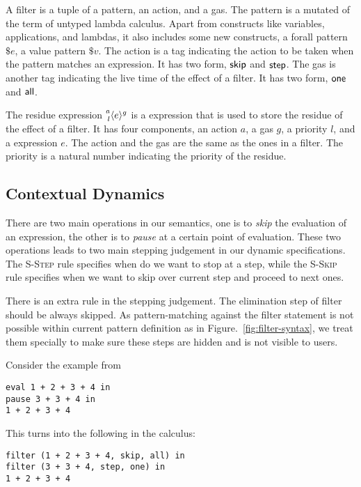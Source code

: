 A filter is a tuple of a pattern, an action, and a gas. The pattern
is a mutated of the term of untyped lambda calculus. Apart from constructs like
variables, applications, and lambdas, it also includes some new constructs, a
forall pattern \(\$e\), a value pattern \(\$v\). The action is a tag indicating
the action to be taken when the pattern matches an expression. It has two
form, \(\ActSkip\) and \(\ActStep\). The gas is another tag indicating the
live time of the effect of a filter. It has two form, \(\GasOne\) and
\(\GasAll\).

The residue expression \(\Residue{a}{g}{l}{e}\) is a expression that is used to
store the residue of the effect of a filter. It has four components, an action
\(a\), a gas \(g\), a priority \(l\), and a expression \(e\). The action and the
gas are the same as the ones in a filter. The priority is a natural number
indicating the priority of the residue.

\subsection{Contextual Dynamics}

There are two main operations in our semantics, one is to \emph{skip} the
evaluation of an expression, the other is to \emph{pause} at a certain point of
evaluation. These two operations leads to two main stepping judgement in our
dynamic specifications. The \textsc{S-Step} rule specifies when do we want to
stop at a step, while the \textsc{S-Skip} rule specifies when we want to skip over
current step and proceed to next ones.

There is an extra rule in the stepping judgement. The elimination step of filter
should be always skipped. As pattern-matching against the filter statement is
not possible within current pattern definition as in
Figure.~\ref{fig:filter-syntax}, we treat them specially to make sure these
steps are hidden and is not visible to users.


Consider the example from
\begin{lstlisting}[language=hazel]
eval 1 + 2 + 3 + 4 in
pause 3 + 3 + 4 in
1 + 2 + 3 + 4
\end{lstlisting}

This turns into the following in the calculus:
\begin{lstlisting}[language=hazel]
filter (1 + 2 + 3 + 4, skip, all) in
filter (3 + 3 + 4, step, one) in
1 + 2 + 3 + 4
\end{lstlisting}

